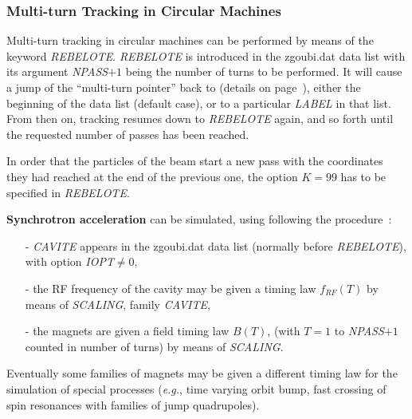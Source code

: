 \subsubsection{Multi-turn Tracking in Circular Machines \label{sec4.6.5} }

Multi-turn tracking  in circular machines can be performed by
means of the keyword \textsl{REBELOTE}. \textsl{REBELOTE} is introduced in 
the  zgoubi.dat data list with its argument \textsl{NPASS}$+1$ being the number of turns to be 
performed. 
It will cause a jump of  the ``multi-turn pointer''  back to (details on page~\pageref{REBELOTE}), 
either the beginning of the data list (default case), or to a particular \textsl{LABEL} 
in that list. From then on, tracking resumes down to \textsl{REBELOTE} again, and so forth until the 
requested number of passes has been reached. 

\medskip

\noindent In order that the \IMAX{} particles of the beam start a new 
pass with the coordinates they had reached at the end of the 
previous one, the option $ K=99 $ has to be specified in \textsl{REBELOTE}.

\medskip


\noindent\textbf{Synchrotron acceleration} can be simulated, using following the procedure~: 
\begin{itemize}
\item[-] \textsl{CAVITE} appears in the zgoubi.dat data list (normally before
\textsl{REBELOTE}), with option \textsl{IOPT}$\neq 0$, 

\item[-] the RF frequency of the cavity may be given a timing law $f_{RF}(T)$ by 
means of \textsl{SCALING}, family \textsl{CAVITE}, 

\item[-] the magnets are given a field  timing law $ B(T)$,  
(with $T=1 $ to \textsl{NPASS}$+1$  counted in number of turns) by means of \textsl{SCALING}. \par
\end{itemize}

\noindent Eventually some families of magnets may be given a different timing law 
    for the simulation of special processes (\emph{e.g.}, time varying orbit bump, 
fast crossing of spin resonances with families of jump quadrupoles). 






